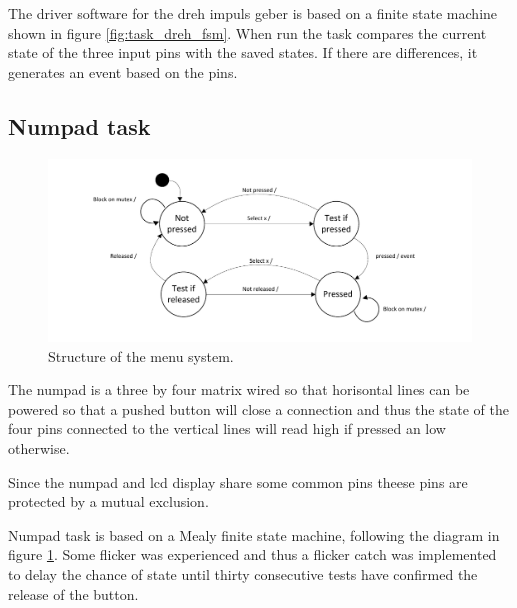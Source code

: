 The driver software for the dreh impuls geber is based on a finite state machine shown in figure \ref{fig:task_dreh_fsm}. When run the task compares the current state of the three input pins with the saved states. If there are differences, it generates an event based on the pins.

\subsection{Numpad task}
\begin{figure}[htb]
	\centering
	\includegraphics[width=\textwidth,trim=0 15 0 15]{graphics/numpad_task_fsm.pdf} 
	\caption{Structure of the menu system.}
	\label{fig:task_numpad_fsm}
\end{figure}
The numpad is a three by four matrix wired so that horisontal lines can be powered so that a pushed button will close a connection and thus the state of the four pins connected to the vertical lines will read high if pressed an low otherwise.

Since the numpad and lcd display share some common pins theese pins are protected by a mutual exclusion.

Numpad task is based on a Mealy finite state machine, following the diagram in figure \ref{fig:task_numpad_fsm}.  Some flicker was experienced and thus a flicker catch was implemented to delay the chance of state until thirty consecutive tests have confirmed the release of the button.


